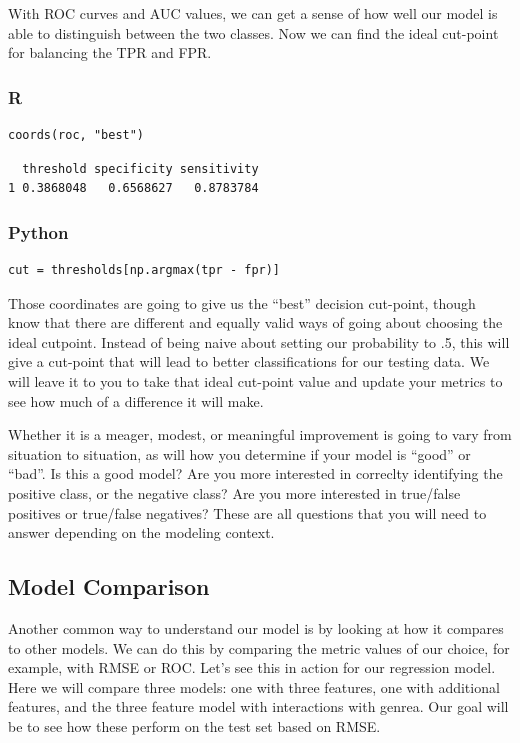 \documentclass[
  letterpaper,
]{krantz}
\begin{document}
With ROC curves and AUC values, we can get a sense of how well our model
is able to distinguish between the two classes. Now we can find the
ideal cut-point for balancing the TPR and FPR.

\subsubsection{R}

\begin{verbatim}
coords(roc, "best")
\end{verbatim}

\begin{verbatim}
  threshold specificity sensitivity
1 0.3868048   0.6568627   0.8783784
\end{verbatim}

\subsubsection{Python}

\begin{verbatim}
cut = thresholds[np.argmax(tpr - fpr)]
\end{verbatim}

Those coordinates are going to give us the ``best'' decision cut-point,
though know that there are different and equally valid ways of going
about choosing the ideal cutpoint. Instead of being naive about setting
our probability to .5, this will give a cut-point that will lead to
better classifications for our testing data. We will leave it to you to
take that ideal cut-point value and update your metrics to see how much
of a difference it will make.

Whether it is a meager, modest, or meaningful improvement is going to
vary from situation to situation, as will how you determine if your
model is ``good'' or ``bad''. Is this a good model? Are you more
interested in correclty identifying the positive class, or the negative
class? Are you more interested in true/false positives or true/false
negatives? These are all questions that you will need to answer
depending on the modeling context.

\subsection{Model Comparison}\label{model-comparison}

Another common way to understand our model is by looking at how it
compares to other models. We can do this by comparing the metric values
of our choice, for example, with RMSE or ROC. Let's see this in action
for our regression model. Here we will compare three models: one with
three features, one with additional features, and the three feature
model with interactions with genrea. Our goal will be to see how these
perform on the test set based on RMSE.
\end{document}
